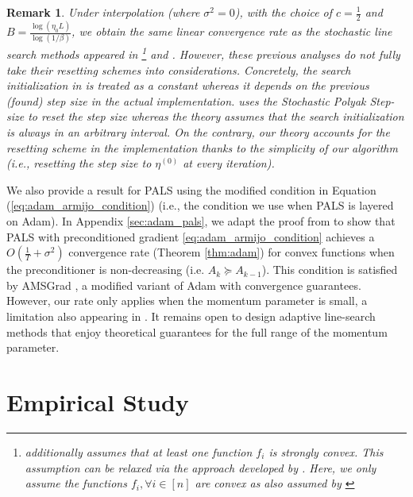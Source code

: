 \documentclass{article}
\newtheorem{remark}[theorem]{Remark}
\begin{document}
\begin{remark}
 Under interpolation (where $\sigma^2 = 0$),     with the choice of $c=\frac{1}{2}$ and $B = \frac{\log(\eta_0 L)}{\log(1/\beta)}$, we obtain the same linear convergence rate as the stochastic line search methods appeared in  \citet{vaswani2019painless}\footnote{\citet{vaswani2019painless} additionally assumes that at least one function $f_i$ is strongly convex. This assumption can be relaxed via the approach developed by \citet[Thm. 3.1]{loizou2021stochastic}. Here, we only assume the functions $f_i,\forall i\in[n]$ are convex as also assumed by \citet{loizou2021stochastic}} and  \citet{galli2023monotone}. However, these previous analyses do not fully take their resetting schemes into considerations. Concretely, the search initialization  in \citet{vaswani2019painless} is treated as a constant whereas it depends on the previous (found) step size in the actual implementation. \citet{galli2023monotone} uses the Stochastic Polyak Step-size \citep{loizou2021stochastic} to reset the step size whereas the theory assumes that the search initialization is always in an arbitrary interval. On the contrary, our theory accounts for the resetting scheme in the implementation thanks to the simplicity of our algorithm (i.e., resetting the step size to $\eta^{(0)}$ at every iteration).      
\end{remark}

We also provide a result for
PALS using the modified condition in Equation (\ref{eq:adam_armijo_condition}) (i.e., the condition we use when PALS is layered on Adam).
In Appendix \ref{sec:adam_pals}, we adapt the proof from \citet{vaswani2020adaptive} to show that PALS with preconditioned gradient \eqref{eq:adam_armijo_condition} achieves a $O(\frac{1}{T} + \sigma^2)$ convergence rate (Theorem \ref{thm:adam}) for convex functions when the preconditioner is non-decreasing (i.e. $A_k \succeq A_{k-1}$). This condition is satisfied by AMSGrad \citep{reddi2019convergence}, a modified variant of Adam with convergence guarantees. However, our rate only applies when the momentum parameter is small, a limitation also appearing in \citet{vaswani2020adaptive}. It remains open to design adaptive line-search methods that enjoy theoretical guarantees for the full range of the momentum parameter.  


\section{Empirical Study}
\end{document}
